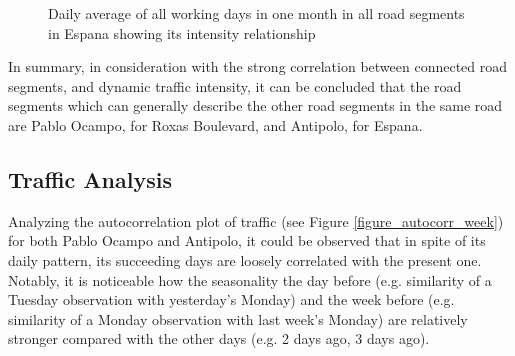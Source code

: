 \begin{figure}[h] 
\centering
    \centering
      \captionsetup{justification=centering}
    \hfill
    \caption{Daily average of all working days in one month in all road segments in Espana showing its intensity relationship}

    \label{figure_traffic_espana}
\end{figure}

In summary, in consideration with the strong correlation between connected road segments, and dynamic traffic intensity, it can be concluded that the road segments which can generally describe the other road segments in the same road are Pablo Ocampo, for Roxas Boulevard, and Antipolo, for Espana.



\subsection{Traffic Analysis}

Analyzing the autocorrelation plot of traffic (see Figure \ref{figure_autocorr_week}) for both Pablo Ocampo and Antipolo, it could be observed that in spite of its daily pattern, its succeeding days are loosely correlated with the present one. Notably, it is noticeable how the seasonality the day before (e.g. similarity of a Tuesday observation with yesterday’s Monday) and the week before (e.g. similarity of a Monday observation with last week's Monday) are relatively stronger compared with the other days (e.g. 2 days ago, 3 days ago).


